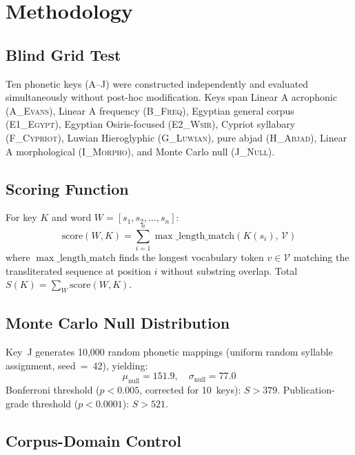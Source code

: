 \documentclass[12pt,a4paper]{article}
\begin{document}
\section{Methodology}

\subsection{Blind Grid Test}

Ten phonetic keys (A--J) were constructed independently and evaluated simultaneously without post-hoc modification. Keys span Linear A acrophonic (\textsc{A\_Evans}), Linear A frequency (\textsc{B\_Freq}), Egyptian general corpus (\textsc{E1\_Egypt}), Egyptian Osiris-focused (\textsc{E2\_Wsir}), Cypriot syllabary (\textsc{F\_Cypriot}), Luwian Hieroglyphic (\textsc{G\_Luwian}), pure abjad (\textsc{H\_Abjad}), Linear A morphological (\textsc{I\_Morpho}), and Monte Carlo null (\textsc{J\_Null}).

\subsection{Scoring Function}

For key $K$ and word $W = [s_1, s_2, \ldots, s_n]$:
\begin{equation}
\text{score}(W, K) = \sum_{i=1}^{n} \max\_\text{length\_match}\!\left(K(s_i),\, \mathcal{V}\right)
\end{equation}
where $\max\_\text{length\_match}$ finds the longest vocabulary token $v \in \mathcal{V}$ matching the transliterated sequence at position $i$ without substring overlap. Total $S(K) = \sum_W \text{score}(W, K)$.

\subsection{Monte Carlo Null Distribution}

Key~J generates 10,000 random phonetic mappings (uniform random syllable assignment, seed~=~42), yielding:
\[
\mu_\text{null} = 151.9, \quad \sigma_\text{null} = 77.0
\]
Bonferroni threshold ($p < 0.005$, corrected for 10~keys): $S > 379$.
Publication-grade threshold ($p < 0.0001$): $S > 521$.

\subsection{Corpus-Domain Control}
\end{document}
